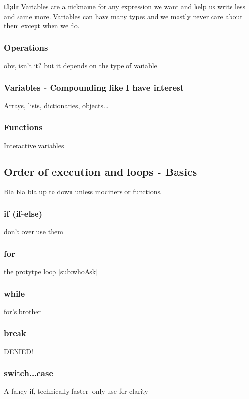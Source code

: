 \large{\textbf{tl;dr}}
Variables are a nickname for any expression we want and help us write less and same more. Variables can have many types and we mostly never care about them except when we do.

\subsubsection{Operations}
\label{subsub:operations}

obv, isn't it? but it depends on the type of variable
\subsubsection{Variables - Compounding like I have interest} 
\label{subsub:array}
Arrays, lists, dictionaries, objects...
\subsubsection{Functions}
\label{subsub:functions}
Interactive variables

\subsection{Order of execution and loops - Basics}
\label{sub:execBasic}
Bla bla bla up to down unless modifiers or functions.
\subsubsection{if (if-else)}
\label{subsub:if}
don't over use them

\subsubsection{for}
\label{subsub:for}
the protytpe loop \ref{sub:whoAsk}

\subsubsection{while}
\label{sub:while}
for's brother

\subsubsection{break}
\label{subsub:break}
DENIED!

\subsubsection{switch...case}
\label{subsub:switch}
A fancy if, technically faster, only use for clarity

